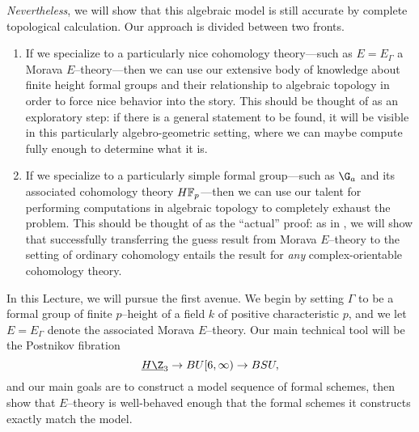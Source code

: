 \emph{Nevertheless}, we will show that this algebraic model is still accurate by complete topological calculation.  Our approach is divided between two fronts.
\begin{enumerate}
    \item If we specialize to a particularly nice cohomology theory---such as $E = E_\Gamma$ a Morava $E$--theory---then we can use our extensive body of knowledge about finite height formal groups and their relationship to algebraic topology in order to force nice behavior into the story.  This should be thought of as an exploratory step: if there is a general statement to be found, it will be visible in this particularly algebro-geometric setting, where we can maybe compute fully enough to determine what it is.
    \item If we specialize to a particularly simple formal group---such as $\G_a$ and its associated cohomology theory $\HFp$---then we can use our talent for performing computations in algebraic topology to completely exhaust the problem.  This should be thought of as the ``actual'' proof: as in , we will show that successfully transferring the guess result from Morava $E$--theory to the setting of ordinary cohomology entails the result for \emph{any} complex-orientable cohomology theory.
\end{enumerate}

In this Lecture, we will pursue the first avenue.  We begin by setting $\Gamma$ to be a formal group of finite $p$--height of a field $k$ of positive characteristic $p$, and we let $E = E_\Gamma$ denote the associated Morava $E$--theory.  Our main technical tool will be the Postnikov fibration \[\OS{H\Z}{3} \to BU[6, \infty) \to BSU,\] and our main goals are to construct a model sequence of formal schemes, then show that $E$--theory is well-behaved enough that the formal schemes it constructs exactly match the model.

